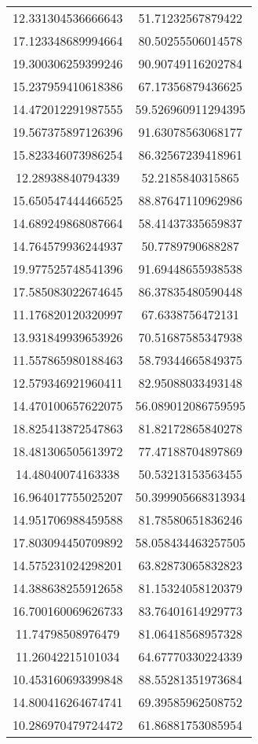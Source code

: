 \begin{table}
\begin{tabular}{cc}
12.331304536666643 & 51.71232567879422 \\
17.123348689994664 & 80.50255506014578 \\
19.300306259399246 & 90.90749116202784 \\
15.237959410618386 & 67.17356879436625 \\
14.472012291987555 & 59.526960911294395 \\
19.567375897126396 & 91.63078563068177 \\
15.823346073986254 & 86.32567239418961 \\
12.28938840794339 & 52.2185840315865 \\
15.650547444466525 & 88.87647110962986 \\
14.689249868087664 & 58.41437335659837 \\
14.764579936244937 & 50.7789790688287 \\
19.977525748541396 & 91.69448655938538 \\
17.585083022674645 & 86.37835480590448 \\
11.176820120320997 & 67.6338756472131 \\
13.931849939653926 & 70.51687585347938 \\
11.557865980188463 & 58.79344665849375 \\
12.579346921960411 & 82.95088033493148 \\
14.470100657622075 & 56.089012086759595 \\
18.825413872547863 & 81.82172865840278 \\
18.481306505613972 & 77.47188704897869 \\
14.48040074163338 & 50.53213153563455 \\
16.964017755025207 & 50.399905668313934 \\
14.951706988459588 & 81.78580651836246 \\
17.803094450709892 & 58.058434463257505 \\
14.575231024298201 & 63.82873065832823 \\
14.388638255912658 & 81.15324058120379 \\
16.700160069626733 & 83.76401614929773 \\
11.74798508976479 & 81.06418568957328 \\
11.26042215101034 & 64.67770330224339 \\
10.453160693399848 & 88.55281351973684 \\
14.800416264674741 & 69.39585962508752 \\
10.286970479724472 & 61.86881753085954 \\

\end{tabular}
\end{table}
